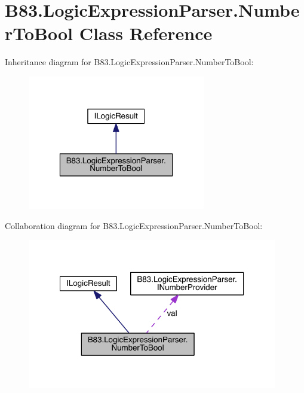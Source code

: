 \hypertarget{class_b83_1_1_logic_expression_parser_1_1_number_to_bool}{}\section{B83.\+Logic\+Expression\+Parser.\+Number\+To\+Bool Class Reference}
\label{class_b83_1_1_logic_expression_parser_1_1_number_to_bool}


Inheritance diagram for B83.\+Logic\+Expression\+Parser.\+Number\+To\+Bool\+:\nopagebreak
\begin{figure}[H]
\begin{center}
\leavevmode
\includegraphics[width=220pt]{class_b83_1_1_logic_expression_parser_1_1_number_to_bool__inherit__graph}
\end{center}
\end{figure}


Collaboration diagram for B83.\+Logic\+Expression\+Parser.\+Number\+To\+Bool\+:\nopagebreak
\begin{figure}[H]
\begin{center}
\leavevmode
\includegraphics[width=309pt]{class_b83_1_1_logic_expression_parser_1_1_number_to_bool__coll__graph}
\end{center}
\end{figure}
